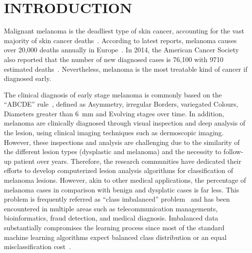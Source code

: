 \graphicspath{ {./content/intro/figures/} }

\section{\uppercase{Introduction}}
\label{sec:intro}  %

\noindent Malignant melanoma is the deadliest type of skin cancer, accounting for the vast majority of skin cancer deaths~\cite{CancerFactsFigures2014}. 
According to latest reports, melanoma causes over 20,000 deaths annually in Europe~\cite{forsea2012melanoma}. 
In 2014, the American Cancer Society also reported that the number of new diagnosed cases is 76,100 with 9710 estimated deaths~\cite{CancerFactsFigures2014}. 
Nevertheless, melanoma is the most treatable kind of cancer if diagnosed early. 

The clinical diagnosis of early stage melanoma is commonly based on the ``ABCDE'' rule~\cite{abbasi2004early}, defined as Asymmetry, irregular Borders, variegated Colours, Diameters greater than \SI{6}{\milli \metre} and Evolving stages over time. 
In addition, melanoma are clinically diagnosed through visual inspection and deep analysis of the lesion, using clinical imaging techniques such as dermoscopic imaging. 
However, these inspections and analysis are challenging due to the similarity of the different lesion types (dysplastic and melanoma) and the necessity to follow-up patient over years.
Therefore, the research communities have dedicated their efforts to develop computerized lesion analysis algorithms for classification of melanoma lesions. 
However, akin to other medical applications, the percentage of melanoma cases in comparison with benign and dysplatic cases is far less. 
This problem is frequently referred as ``class imbalanced'' problem~\cite{prati2009data} and has been encountered in multiple areas such as telecommunication managements, bioinformatics, fraud detection, and medical diagnosis. 
Imbalanced data substantially compromises the learning process since most of the standard machine learning algorithms expect balanced class distribution or an equal misclassification cost~\cite{he2009learning}.


